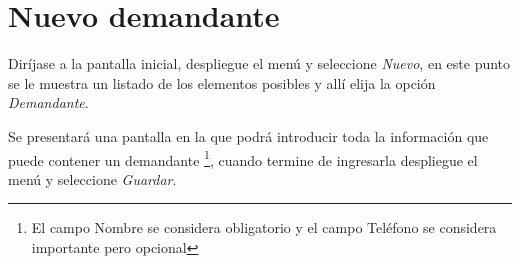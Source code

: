 \section{Nuevo demandante}
\label{sec:nuevoDemandante}
Dir\'ijase a la pantalla inicial, despliegue el men\'u \blackberry y seleccione
\emph{Nuevo}, en este punto se le muestra un listado de los elementos posibles y
all\'i elija la opci\'on \emph{Demandante}.

Se presentar\'a una pantalla en la que podr\'a introducir toda la informaci\'on
que puede contener un demandante
\footnote{El campo Nombre se considera obligatorio y el campo Tel\'efono se
considera importante pero opcional},
cuando termine de ingresarla despliegue el men\'u \blackberry y seleccione
\emph{Guardar}.




